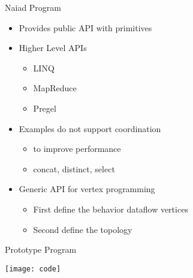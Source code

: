  \begin{frame}[t]{Naiad Program}
  \vspace{0.15cm}
   \begin{itemize}\setlength\itemsep{0.25cm}
     \item Provides public API with primitives
     \item Higher Level APIs
     \begin{itemize}\setlength\itemsep{0.25cm}
      \item LINQ
      \item MapReduce
      \item Pregel
     \end{itemize}
     \item Examples do not support coordination
     \begin{itemize}\setlength\itemsep{0.25cm}
     \item to improve performance
     \item concat, distinct, select
     \end{itemize}
     \item Generic API for vertex programming
     \begin{itemize}\setlength\itemsep{0.25cm}
     \item First define the behavior dataflow vertices
     \item Second define the topology
     \end{itemize}
   \end{itemize}

\end{frame}

\begin{frame}[t]{Prototype Program}

\begin{center}
  \texttt{[image: code]}
\end{center}

\end{frame}
